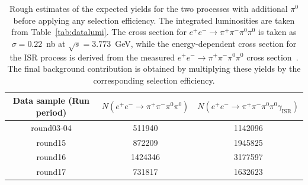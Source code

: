 \begin{table}[t]
    \begin{center}
        \caption{Rough estimates of the expected yields for the two processes with additional $\pi^{0}$ before applying any selection efficiency. The integrated luminosities are taken from Table~\ref{tab:datalumi}. The cross section for $e^{+}e^{-} \to \pi^{+}\pi^{-}\pi^{0}\pi^{0}$ is taken as $\sigma = 0.22$~nb at $\sqrt{s}=3.773$~GeV, while the energy-dependent cross section for the ISR process is derived from the measured $e^{+}e^{-} \to \pi^{+}\pi^{-}\pi^{0}\pi^{0}$ cross section~\cite{BaBar2017_4pi0}. The final background contribution is obtained by multiplying these yields by the corresponding selection efficiency.}
        \vspace{4mm}
        \begin{tabular}{c | c | c}
            \hline \hline
            Data sample (Run period) & $N(e^{+}e^{-} \to \pi^{+}\pi^{-}\pi^{0}\pi^{0})$ & $N(e^{+}e^{-} \to \pi^{+}\pi^{-}\pi^{0}\pi^{0}\gamma_{\text{ISR}})$ \\
            \hline
            round03-04               & 511940                                           & 1142096                                                             \\
            \hline
            round15                  & 872209                                           & 1945825                                                             \\
            \hline
            round16                  & 1424346                                          & 3177597                                                             \\
            \hline
            round17                  & 731817                                           & 1632623                                                             \\
            \hline \hline
        \end{tabular}
        \label{tab:background_yield_estimate}
    \end{center}
\end{table}

